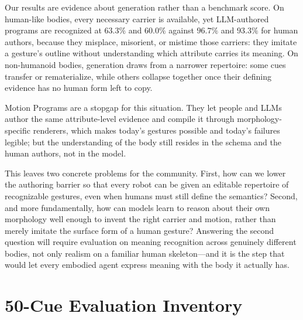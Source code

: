\documentclass[letterpaper,10pt,conference]{ieeeconf}
\begin{document}
Our results are evidence about generation rather than a benchmark score.
On human-like bodies, every necessary carrier is available, yet LLM-authored programs are recognized at $63.3\%$ and $60.0\%$ against $96.7\%$ and $93.3\%$ for human authors, because they misplace, misorient, or mistime those carriers: they imitate a gesture's outline without understanding which attribute carries its meaning.
On non-humanoid bodies, generation draws from a narrower repertoire: some cues transfer or rematerialize, while others collapse together once their defining evidence has no human form left to copy.

Motion Programs are a stopgap for this situation.
They let people and LLMs author the same attribute-level evidence and compile it through morphology-specific renderers, which makes today's gestures possible and today's failures legible; but the understanding of the body still resides in the schema and the human authors, not in the model.

This leaves two concrete problems for the community.
First, how can we lower the authoring barrier so that every robot can be given an editable repertoire of recognizable gestures, even when humans must still define the semantics?
Second, and more fundamentally, how can models learn to reason about their own morphology well enough to invent the right carrier and motion, rather than merely imitate the surface form of a human gesture?
Answering the second question will require evaluation on meaning recognition across genuinely different bodies, not only realism on a familiar human skeleton---and it is the step that would let every embodied agent express meaning with the body it actually has.

\appendix

\section{50-Cue Evaluation Inventory}
\label{app:cue-inventory}


{\scriptsize


}
\end{document}
